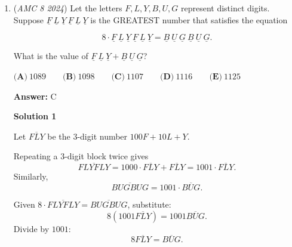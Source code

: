 \begin{enumerate}
 



\textbf{Solution 4 (On paper)}

We can cross off a few routes:

 
            \begin{itemize}
        \item AM can be crossed off because AXM is shorter
        \item XY can be crossed off because XMY is shorter
        \item YZ can be crossed off because YCZ is shorter
        \item MC can be crossed off because MYC is shorter
        \item MZ can be crossed off because MCZ is shorter
            \end{itemize}
            Finally, we are left with a single path AXMYCZ from A to Z which adding it up gives $28 = \boxed{\textbf{(A)}}.$



	\item (\textit{AMC 8 2024}) Let the letters $F,L,Y,B,U,G$ represent distinct digits. Suppose $\underline{F}~\underline{L}~\underline{Y}~\underline{F}~\underline{L}~\underline{Y}$ is the GREATEST number that satisfies the equation


 
 \[8\cdot\underline{F}~\underline{L}~\underline{Y}~\underline{F}~\underline{L}~\underline{Y}=\underline{B}~\underline{U}~\underline{G}~\underline{B}~\underline{U}~\underline{G}.\]


 What is the value of $\underline{F}~\underline{L}~\underline{Y}+\underline{B}~\underline{U}~\underline{G}$?


 $\textbf{(A)}\ 1089 \qquad \textbf{(B)}\ 1098 \qquad \textbf{(C)}\ 1107 \qquad \textbf{(D)}\ 1116 \qquad \textbf{(E)}\ 1125$

 \textbf{Answer: }C



\textbf{Solution 1}

Let $\overline{FLY}$ be the $3$-digit number $100F+10L+Y$.

 Repeating a $3$-digit block twice gives
 \[\overline{FLYFLY}=1000\cdot \overline{FLY}+\overline{FLY}=1001\cdot \overline{FLY}.\]Similarly,
 \[\overline{BUGBUG}=1001\cdot \overline{BUG}.\]

 Given $8\cdot \overline{FLYFLY}=\overline{BUGBUG}$, substitute:
 \[8(1001\overline{FLY})=1001\overline{BUG}.\]Divide by $1001$:
 \[8\overline{FLY}=\overline{BUG}.\]


\end{enumerate}
